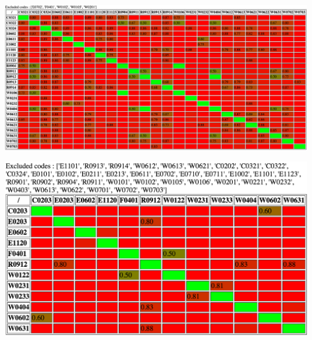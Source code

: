 \documentclass[12pt, a4paper]{article}
\begin{document}
\includegraphics[angle=90,origin=c,totalheight=\textheight]{cap2}

\includegraphics[angle=90,origin=c,totalheight=\textheight]{cap3}
\end{document}
